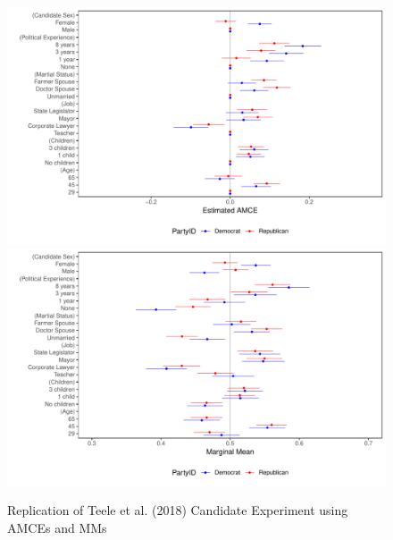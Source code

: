 \documentclass[a4paper,12pt]{article}\usepackage[]{graphicx}\usepackage[]{color}
\makeatletter
\def\maxwidth{ %
  \ifdim\Gin@nat@width>\linewidth
    \linewidth
  \else
    \Gin@nat@width
  \fi
}
\newenvironment{knitrout}{}{} %
\makeatother
\begin{document}
\begin{knitrout}
\color{fgcolor}\begin{figure}
\includegraphics[width=\maxwidth]{figure/tkr_replication-1} 
\includegraphics[width=\maxwidth]{figure/tkr_replication-2} \caption[Replication of Teele et al]{Replication of Teele et al. (2018) Candidate Experiment using AMCEs and MMs}\label{fig:tkr_replication}
\end{figure}


\end{knitrout}
\end{document}
